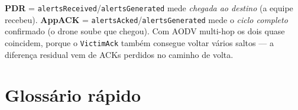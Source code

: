 \documentclass[11pt,a4paper]{article}
\begin{document}
\begin{explica}
\textbf{PDR} = \texttt{alertsReceived}/\texttt{alertsGenerated} mede
\emph{chegada ao destino} (a equipe recebeu). \textbf{AppACK} =
\texttt{alertsAcked}/\texttt{alertsGenerated} mede o \emph{ciclo completo}
confirmado (o drone soube que chegou). Com AODV multi-hop os dois quase
coincidem, porque o \texttt{VictimAck} também consegue voltar vários saltos
--- a diferença residual vem de ACKs perdidos no caminho de volta.
\end{explica}

\newpage
\section{Glossário rápido}
\end{document}
